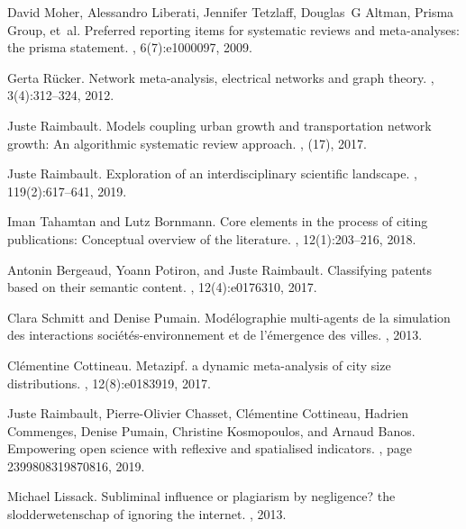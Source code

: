 \documentclass[10pt]{article}
\begin{document}
\begin{thebibliography}{10}
David Moher, Alessandro Liberati, Jennifer Tetzlaff, Douglas~G Altman, Prisma
  Group, et~al.
\newblock Preferred reporting items for systematic reviews and meta-analyses:
  the prisma statement.
, 6(7):e1000097, 2009.

Gerta R{\"u}cker.
\newblock Network meta-analysis, electrical networks and graph theory.
, 3(4):312--324, 2012.

Juste Raimbault.
\newblock Models coupling urban growth and transportation network growth: An
  algorithmic systematic review approach.
, (17), 2017.

Juste Raimbault.
\newblock Exploration of an interdisciplinary scientific landscape.
, 119(2):617--641, 2019.

Iman Tahamtan and Lutz Bornmann.
\newblock Core elements in the process of citing publications: Conceptual
  overview of the literature.
, 12(1):203--216, 2018.

Antonin Bergeaud, Yoann Potiron, and Juste Raimbault.
\newblock Classifying patents based on their semantic content.
, 12(4):e0176310, 2017.

Clara Schmitt and Denise Pumain.
\newblock Mod{\'e}lographie multi-agents de la simulation des interactions
  soci{\'e}t{\'e}s-environnement et de l’{\'e}mergence des villes.
, 2013.

Cl{\'e}mentine Cottineau.
\newblock Metazipf. a dynamic meta-analysis of city size distributions.
, 12(8):e0183919, 2017.

Juste Raimbault, Pierre-Olivier Chasset, Cl{\'e}mentine Cottineau, Hadrien
  Commenges, Denise Pumain, Christine Kosmopoulos, and Arnaud Banos.
\newblock Empowering open science with reflexive and spatialised indicators.
,
  page 2399808319870816, 2019.

Michael Lissack.
\newblock Subliminal influence or plagiarism by negligence? the
  slodderwetenschap of ignoring the internet.
, 2013.


\end{thebibliography}
\end{document}

